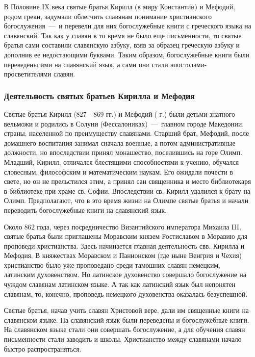 \documentclass[11pt,a4paper,oneside]{memoir}
\begin{document}
    В Половине IX века святые братья Кирилл (в миру Константин) и Мефодий, родом греки, задумали облегчить славянам понимание христианского богослужения~---~и перевели для них богослужебные книги с греческого языка на славянский. Так как у славян в то время не было еще письменности, то святые братья сами составили славянскую азбуку, взяв за образец греческую азбуку и дополнив ее недостающими буквами. Таким образом, богослужебные книги были переведены ими на славянский язык, а сами они стали апостолами-просветителями славян.
    
                \subsubsection{Деятельность святых братьев Кирилла и Мефодия}

    Святые братья Кирилл (827---869 гг.) и Мефодий ( г.) были детьми знатного вельможи и родились в Солуни (Фессалониках)~---~главном городе Македонии, страны, населенной по преимуществу славянами. Старший брат, Мефодий, после домашнего воспитания занимал сначала военные, а потом административные должности, но впоследствии принял монашество, поселившись на горе Олимп. Младший, Кирилл, отличался блестящими способностями к учению, обучался словесным, философским и математическим наукам. Его ожидали почести в свете, но он не прельстился этим, а принял сан священника и место библиотекаря в библиотеке при храме св. Софии. Впоследствии св. Кирилл удалился к брату на Олимп. Предполагают, что в это время жизни на Олимпе святые братья и начали переводить богослужебные книги на славянский язык.

    Около 862 года, через посредничество Византийского императора Михаила III, святые братья были приглашены Моравским князем Ростиславом в Моравию для проповеди христианства. Здесь начинается главная деятельность свв. Кирилла и Мефодия. В княжествах Моравском и Панионском (где ныне Венгрия и Чехия) христианство было уже проповедано среди тамошних славян немецким, латинским духовенством. Но латинское духовенство совершало богослужение на чуждом славянам латинском языке. А так как латинский язык был непонятен славянам, то, конечно, проповедь немецкого духовенства оказалась безуспешной.

    Святые братья, начав учить славян Христовой вере, дали им священные книги на славянском языке. На славянский язык были переведены и богослужебные книги. На славянском языке стали они совершать богослужение, а для обучения славян письменности стали заводить и школы. Христианство между славянами начало быстро распространяться.
\end{document}
